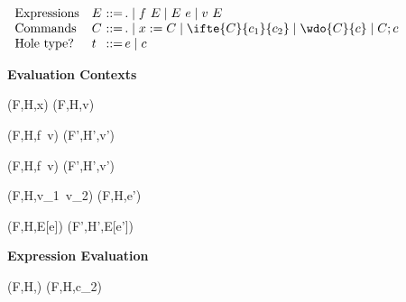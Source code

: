 \begin{figure*}
\begin{comment}
(* Expression evaluation: (F,H,e) - o -> (F',H',e') *)

(* Notational convention: 
   write 
     (F,H,e) - None -> (F',H',e') 
   as 
     (F,H,e) --> (F',H',e') 
*)  

(* Command evaluation: (F,H,c) - o -> (F',H',c') *)
C[t] needs to be well-formed...

(* Multi-step command evaluation: (F,H,c) - l -> (F',H',c') *)
\end{comment}
\begin{minipage}[t]{\linewidth}
\begin{displaymath}
\begin{array}{l@{\quad}l@{~}l@{\,}ll@{}}
 \text{Expressions} & E  & ::= & . \mid f~E \mid E~e \mid v~E \\
 \text{Commands} & C  & ::= & . \mid x := C \mid \ifte{C}{c_1}{c_2} \mid \wdo{C}{c} \mid C ; c \\
 \text{Hole type?} & t & ::=  & e \mid c
\end{array}
\end{displaymath}
\end{minipage}
\centerline{\textbf{Evaluation Contexts}}

\begin{minipage}{0.5\linewidth}
{(F,H,x) \rightarrow (F,H,v)}
\vspace{8pt}

{(F,H,f~v)  (F',H',v')}
\vspace{8pt}

{(F,H,f~v) \rightarrow (F',H',v')}
\end{minipage}
\hfill
\begin{minipage}{0.5\linewidth}
{(F,H,v_1~v_2) \rightarrow (F,H,e'})
\vspace{8pt}

{(F,H,E[e])  (F',H',E[e'])}
\end{minipage}
\centerline{\textbf{Expression Evaluation}}

\begin{minipage}[t]{0.5\linewidth}
\infrule[C-IfFalse]
{}
{(F,H,) \rightarrow (F,H,c_2)}
\vspace{8pt}


\end{minipage}
\end{figure*}
